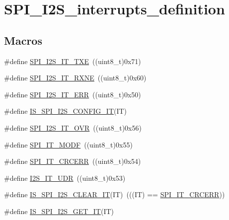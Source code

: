 \hypertarget{group___s_p_i___i2_s__interrupts__definition}{}\section{S\+P\+I\+\_\+\+I2\+S\+\_\+interrupts\+\_\+definition}
\label{group___s_p_i___i2_s__interrupts__definition}
\subsection*{Macros}
\begin{DoxyCompactItemize}
\item 
\#define \mbox{\hyperlink{group___s_p_i___i2_s__interrupts__definition_ga0f192977fdb12c40d35672b8ae074724}{S\+P\+I\+\_\+\+I2\+S\+\_\+\+I\+T\+\_\+\+T\+XE}}~((uint8\+\_\+t)0x71)
\item 
\#define \mbox{\hyperlink{group___s_p_i___i2_s__interrupts__definition_gae46dd53cd2e4ad8b8a7836d3dcec57ea}{S\+P\+I\+\_\+\+I2\+S\+\_\+\+I\+T\+\_\+\+R\+X\+NE}}~((uint8\+\_\+t)0x60)
\item 
\#define \mbox{\hyperlink{group___s_p_i___i2_s__interrupts__definition_ga1d9d4916bf7ae315f23a54ecfbcd9157}{S\+P\+I\+\_\+\+I2\+S\+\_\+\+I\+T\+\_\+\+E\+RR}}~((uint8\+\_\+t)0x50)
\item 
\#define \mbox{\hyperlink{group___s_p_i___i2_s__interrupts__definition_ga3ec2f6950d7ff801f992e65593c3365e}{I\+S\+\_\+\+S\+P\+I\+\_\+\+I2\+S\+\_\+\+C\+O\+N\+F\+I\+G\+\_\+\+IT}}(IT)
\item 
\#define \mbox{\hyperlink{group___s_p_i___i2_s__interrupts__definition_ga279c30176e8ff7e2ec299774a2e88f45}{S\+P\+I\+\_\+\+I2\+S\+\_\+\+I\+T\+\_\+\+O\+VR}}~((uint8\+\_\+t)0x56)
\item 
\#define \mbox{\hyperlink{group___s_p_i___i2_s__interrupts__definition_ga0b9780d5f31fd80f4d0fa7d6860041e9}{S\+P\+I\+\_\+\+I\+T\+\_\+\+M\+O\+DF}}~((uint8\+\_\+t)0x55)
\item 
\#define \mbox{\hyperlink{group___s_p_i___i2_s__interrupts__definition_ga9aa97a5ce8d3500dc14ca4e30eada199}{S\+P\+I\+\_\+\+I\+T\+\_\+\+C\+R\+C\+E\+RR}}~((uint8\+\_\+t)0x54)
\item 
\#define \mbox{\hyperlink{group___s_p_i___i2_s__interrupts__definition_ga54aba7dc06f97fb4839de5f42bd5a47d}{I2\+S\+\_\+\+I\+T\+\_\+\+U\+DR}}~((uint8\+\_\+t)0x53)
\item 
\#define \mbox{\hyperlink{group___s_p_i___i2_s__interrupts__definition_gabeb917a0a708af0439f753a5f4af4c5e}{I\+S\+\_\+\+S\+P\+I\+\_\+\+I2\+S\+\_\+\+C\+L\+E\+A\+R\+\_\+\+IT}}(IT)~(((IT) == \mbox{\hyperlink{group___s_p_i___i2_s__interrupts__definition_ga9aa97a5ce8d3500dc14ca4e30eada199}{S\+P\+I\+\_\+\+I\+T\+\_\+\+C\+R\+C\+E\+RR}}))
\item 
\#define \mbox{\hyperlink{group___s_p_i___i2_s__interrupts__definition_gacb2949c066a74f1c4ef8c6a0d4e14a0c}{I\+S\+\_\+\+S\+P\+I\+\_\+\+I2\+S\+\_\+\+G\+E\+T\+\_\+\+IT}}(IT)
\end{DoxyCompactItemize}


